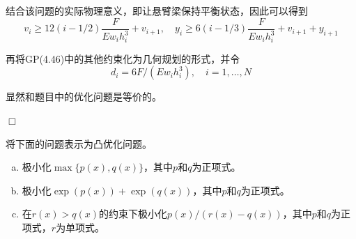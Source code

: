 \documentclass[10pt, a4paper]{article}
\begin{document}
结合该问题的实际物理意义，即让悬臂梁保持平衡状态，因此可以得到
\[v_{i} \geq 12(i-1 / 2) \frac{F}{E w_{i} h_{i}^{3}}+v_{i+1}, \quad y_{i} \geq 6(i-1 / 3) \frac{F}{E w_{i} h_{i}^{3}}+v_{i+1}+y_{i+1}\]

再将GP(4.46)中的其他约束化为几何规划的形式，并令
\[d_{i}=6 F /\left(E w_{i} h_{i}^{3}\right), \quad i=1, \ldots, N\]

显然和题目中的优化问题是等价的。

\hfill $\Box$
\vspace*{3em}

\begin{Problem}
将下面的问题表示为凸优化问题。
\begin{enumerate}[(a)]
    \item 极小化$\max \{p(x), q(x)\} $，其中$p$和$q$为正项式。
    \item 极小化$\exp (p(x))+\exp (q(x))$，其中$p$和$q$为正项式。
    \item 在$r(x)>q(x)$的约束下极小化$p(x) /(r(x)-q(x))$，其中$p$和$q$为正项式，$r$为单项式。
\end{enumerate}
\end{Problem}
    
\end{document}
